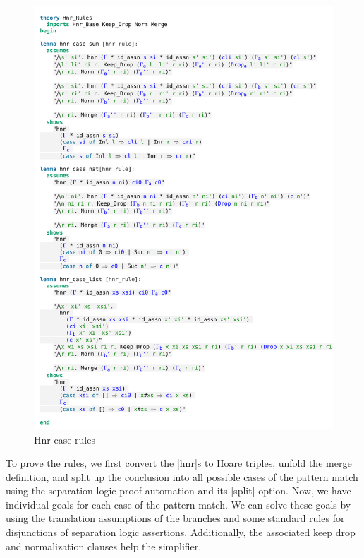 \begin{figure}[htpb]
    \includegraphics[trim={0 1,2cm 0 2,4cm}, clip, width=1.00\textwidth]{figures/Theory_Hnr_Rules_Case.pdf}
    \caption[Hnr case rules]{Hnr case rules}
    \label{fig:hnr_case}
\end{figure}

\noindent To prove the rules, we first convert the |hnr|s to Hoare triples, unfold the merge definition, and split up the conclusion into all possible cases of the pattern match using the separation logic proof automation and its |split| option. Now, we have individual goals for each case of the pattern match. We can solve these goals by using the translation assumptions of the branches and some standard rules for disjunctions of separation logic assertions. Additionally, the associated keep drop and normalization clauses help the simplifier.

